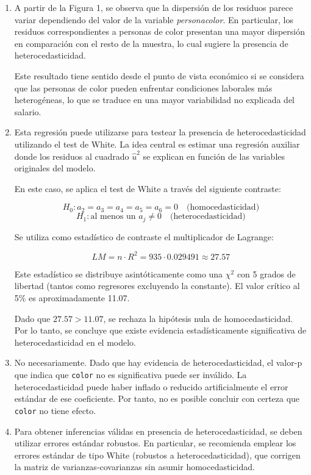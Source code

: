 \documentclass[10pt,a4paper]{article}
\begin{document}
\begin{enumerate}
    \item {\color{blue}
    A partir de la Figura 1, se observa que la dispersión de los residuos parece variar dependiendo del valor de la variable \emph{personacolor}. En particular, los residuos correspondientes a personas de color presentan una mayor dispersión en comparación con el resto de la muestra, lo cual sugiere la presencia de heterocedasticidad.

    Este resultado tiene sentido desde el punto de vista económico si se considera que las personas de color pueden enfrentar condiciones laborales más heterogéneas, lo que se traduce en una mayor variabilidad no explicada del salario.}

    \item {\color{blue}
    Esta regresión puede utilizarse para testear la presencia de heterocedasticidad utilizando el test de White. La idea central es estimar una regresión auxiliar donde los residuos al cuadrado $\hat{u}^2$ se explican en función de las variables originales del modelo.

    En este caso, se aplica el test de White a través del siguiente contraste:

    \[
    H_0: a_2 = a_3 = a_4 = a_5 = a_6 = 0 \quad \text{(homocedasticidad)}
    \]
    \[
    H_1: \text{al menos un } a_j \neq 0 \quad \text{(heterocedasticidad)}
    \]

    Se utiliza como estadístico de contraste el multiplicador de Lagrange:

    \[
    LM = n \cdot R^2 = 935 \cdot 0.029491 \approx 27.57
    \]

    Este estadístico se distribuye asintóticamente como una $\chi^2$ con 5 grados de libertad (tantos como regresores excluyendo la constante). El valor crítico al 5\% es aproximadamente 11.07.

    Dado que $27.57 > 11.07$, se rechaza la hipótesis nula de homocedasticidad. Por lo tanto, se concluye que existe evidencia estadísticamente significativa de heterocedasticidad en el modelo.}


 \item {\color{blue}
    No necesariamente. Dado que hay evidencia de heterocedasticidad, el valor-p que indica que \texttt{color} no es significativa puede ser inválido. La heterocedasticidad puede haber inflado o reducido artificialmente el error estándar de ese coeficiente. Por tanto, no es posible concluir con certeza que \texttt{color} no tiene efecto.
    }   

  \item   {\color{blue}
    Para obtener inferencias válidas en presencia de heterocedasticidad, se deben utilizar errores estándar robustos. En particular, se recomienda emplear los errores estándar de tipo White (robustos a heterocedasticidad), que corrigen la matriz de varianzas-covarianzas sin asumir homocedasticidad.
    }
\end{enumerate}
\end{document}
